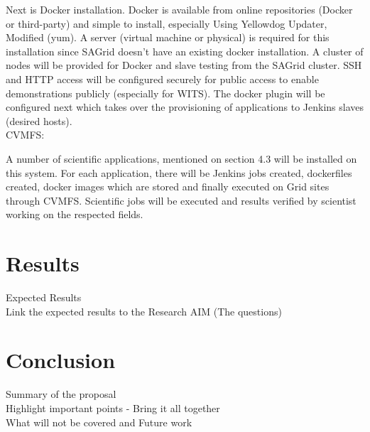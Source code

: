 \documentclass [titlepage,11pt]{article}
\begin{document}
Next is Docker installation. Docker is available from online repositories (Docker or third-party) and simple to install, especially Using Yellowdog Updater, Modified (yum).  A server (virtual machine or physical) is required for this installation since SAGrid doesn't have an existing docker installation. A cluster of nodes will be provided for Docker and slave testing from the SAGrid cluster. SSH and HTTP access will be configured securely for public access to enable demonstrations publicly (especially for WITS). The docker plugin will be configured next which takes over the provisioning of applications to Jenkins slaves (desired hosts).  \\

CVMFS:

A number of scientific applications, mentioned on section 4.3 will be installed on this system. For each application, there will be Jenkins jobs created, dockerfiles created, docker images which are stored and finally executed on Grid sites through CVMFS. Scientific jobs will be executed and results verified by scientist working on the respected fields. 



\section{Results}
Expected Results \\
Link the expected results to the Research AIM (The questions)

\section{Conclusion}
Summary of the proposal \\
Highlight important points  - Bring it all together\\
What will not be covered and Future work \\


\end{document}
